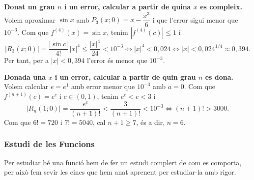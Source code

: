 \documentclass[12pt]{article}
\begin{document}
\begin{examplebox}{}
    \textbf{Donat un grau $n$ i un error, calcular a partir de quina $x$ es
    compleix.} Volem aproximar $\sin x$ amb $P_3(x;0)=x-\dfrac{x^3}{6}$ i que
    l'error sigui menor que $10^{-3}$. Com que $f^{(4)}(x)=\sin x$, tenim
    $|f^{(4)}(c)|\le 1$ i
    \[
      |R_3(x;0)|=\frac{|\sin c|}{4!}\,|x|^4\le\frac{|x|^4}{24}<10^{-3}
      \iff |x|^4<0{,}024 \iff |x|<0{,}024^{1/4}\approx 0{,}394 .
    \]
    Per tant, per a $|x|<0{,}394$ l'error és menor que $10^{-3}$.

    \medskip
    \textbf{Donada una $x$ i un error, calcular a partir de quin grau $n$ es
    dona.} Volem calcular $e=e^1$ amb error menor que $10^{-3}$ amb $a=0$.
    Com que $f^{(n+1)}(c)=e^c$ i $c\in(0,1)$, tenim $e^c<e<3$ i
    \[
      |R_n(1;0)|=\frac{e^c}{(n+1)!}<\frac{3}{(n+1)!}<10^{-3}
      \iff (n+1)!>3000 .
    \]
    Com que $6!=720$ i $7!=5040$, cal $n+1\ge 7$, és a dir, $n=6$.
\end{examplebox} 
\subsubsection{Estudi de les Funcions}

Per estudiar bé una funció hem de fer un estudi complert de com es comporta, per això fem sevir les eines que hem anat aprenent per estudiar-la amb rigor.
\end{document}
